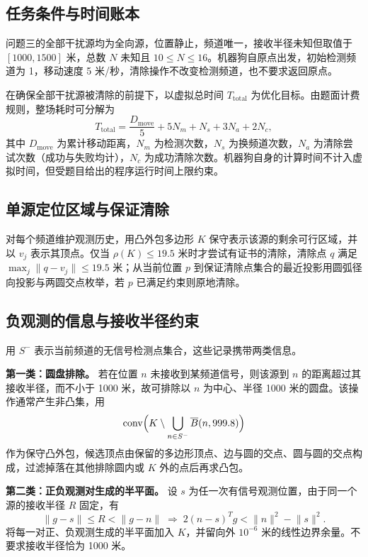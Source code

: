 \documentclass[UTF8,a4paper,zihao=-4,fontset=none]{ctexart}
\begin{document}
\subsection{任务条件与时间账本}

问题三的全部干扰源均为全向源，位置静止，频道唯一，接收半径未知但取值于 \([1000,1500]\) 米，总数 \(N\) 未知且 \(10\le N\le16\)。机器狗自原点出发，初始检测频道为 1，移动速度 5 米/秒，清除操作不改变检测频道，也不要求返回原点。

在确保全部干扰源被清除的前提下，以虚拟总时间 \(T_{\mathrm{total}}\) 为优化目标。由题面计费规则，整场耗时可分解为
\begin{equation}
  T_{\mathrm{total}}=\frac{D_{\mathrm{move}}}{5}+5N_m+N_s+3N_a+2N_c,
  \label{eq:q3-ledger}
\end{equation}
其中 \(D_{\mathrm{move}}\) 为累计移动距离，\(N_m\) 为检测次数，\(N_s\) 为换频道次数，\(N_a\) 为清除尝试次数（成功与失败均计），\(N_c\) 为成功清除次数。机器狗自身的计算时间不计入虚拟时间，但受题目给出的程序运行时间上限约束。

\subsection{单源定位区域与保证清除}

对每个频道维护观测历史，用凸外包多边形 \(K\) 保守表示该源的剩余可行区域，并以 \(v_j\) 表示其顶点。仅当 \(\rho(K)\le19.5\) 米时才尝试有证书的清除，清除点 \(q\) 满足 \(\max_j\lVert q-v_j\rVert\le19.5\) 米；从当前位置 \(p\) 到保证清除点集合的最近投影用圆弧径向投影与两圆交点枚举，若 \(p\) 已满足约束则原地清除。

\subsection{负观测的信息与接收半径约束}

用 \(S^-\) 表示当前频道的无信号检测点集合，这些记录携带两类信息。

\textbf{第一类：圆盘排除。} 若在位置 \(n\) 未接收到某频道信号，则该源到 \(n\) 的距离超过其接收半径，而不小于 1000 米，故可排除以 \(n\) 为中心、半径 1000 米的圆盘。该操作通常产生非凸集，用
\begin{equation}
  \operatorname{conv}\Bigl(K\setminus\bigcup_{n\in S^-}\overline{B}(n,999.8)\Bigr)
  \label{eq:q3-disk}
\end{equation}
作为保守凸外包，候选顶点由保留的多边形顶点、边与圆的交点、圆与圆的交点构成，过滤掉落在其他排除圆内或 \(K\) 外的点后再求凸包。

\textbf{第二类：正负观测对生成的半平面。} 设 \(s\) 为任一次有信号观测位置，由于同一个源的接收半径 \(R\) 固定，有
\begin{equation}
  \lVert g-s\rVert\le R<\lVert g-n\rVert
  \;\Longrightarrow\;
  2(n-s)^{T}g<\lVert n\rVert^{2}-\lVert s\rVert^{2}.
  \label{eq:q3-halfplane}
\end{equation}
将每一对正、负观测生成的半平面加入 \(K\)，并留向外 \(10^{-6}\) 米的线性边界余量。不要求接收半径恰为 1000 米。
\end{document}
